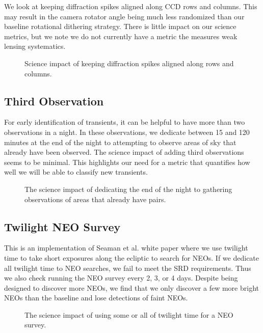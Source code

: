 We look at keeping diffraction spikes aligned along CCD rows and columns. This may result in the camera rotator angle being much less randomized than our baseline rotational dithering strategy. There is little impact on our science metrics, but we note we do not currently have a metric the measures weak lensing systematics.

\begin{figure}
\caption{Science impact of keeping diffraction spikes aligned along rows and columns. }
\end{figure}

\subsection{Third Observation}

For early identification of transients, it can be helpful to have more than two observations in a night. In these observations, we dedicate between 15 and 120 minutes at the end of the night to attempting to observe areas of sky that already have been observed.  The science impact of adding third observations seems to be minimal. This highlights our need for a metric that quantifies how well we will be able to classify new transients.

\begin{figure}
\caption{The science impact of dedicating the end of the night to gathering observations of areas that already have pairs.  }
\end{figure}

\subsection{Twilight NEO Survey}

This is an implementation of Seaman et al. white paper where we use twilight time to take short exposures along the ecliptic to search for NEOs.  If we dedicate all twilight time to NEO searches, we fail to meet the SRD requirements. Thus we also check running the NEO survey every 2, 3, or 4 days. Despite being designed to discover more NEOs, we find that we only discover a few more bright NEOs than the baseline and lose detections of faint NEOs. 

\begin{figure}
\caption{The science impact of using some or all of twilight time for a NEO survey.}\label{fig:neoradar}
\end{figure}

